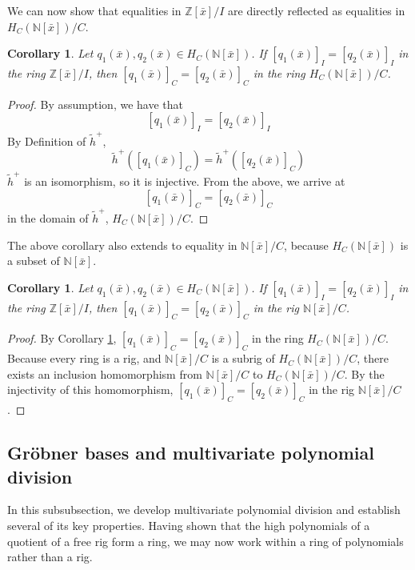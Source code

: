 \documentclass{msthesis}
\newtheorem{corollary}[theorem]{Corollary}
\theoremstyle{definition}
\newcommand{\ints}{\mathbb{Z}}
\newcommand{\nat}{\mathbb{N}}
\begin{document}
We can now show that equalities in $\ints[\bar{x}]/I$ are directly reflected as equalities in $H_C(\nat[\bar{x}])/C$.

\begin{corollary}\label{cor:equalityZtoN}
    Let $q_1(\bar{x}), q_2(\bar{x}) \in H_C(\nat[\bar{x}])$.  If $[q_1(\bar{x})]_I = [q_2(\bar{x})]_I$ in the ring $\ints[\bar{x}]/I$, then $[q_1(\bar{x})]_C = [q_2(\bar{x})]_C$ in the ring $H_C(\nat[\bar{x}])/C$.
\end{corollary}
\begin{proof}
    By assumption, we have that 
    \[ [q_1(\bar{x})]_I = [q_2(\bar{x})]_I \]
    By Definition of $\tilde{h}^+$, 
    \[ \tilde{h}^+([q_1(\bar{x})]_C) = \tilde{h}^+([q_2(\bar{x})]_C)\]
    $\tilde{h}^+$ is an isomorphism, so it is injective.  From the above, we arrive at
    \[ [q_1(\bar{x})]_C = [q_2(\bar{x})]_C \]
    in the domain of $\tilde{h}^+$, $H_C(\nat[\bar{x}])/C$.
\end{proof}

The above corollary also extends to equality in $\nat[\bar{x}]/C$, because $H_C(\nat[\bar{x}])$ is a subset of $\nat[\bar{x}]$.

\begin{corollary}\label{cor:equalityHNtoN}
    Let $q_1(\bar{x}), q_2(\bar{x}) \in H_C(\nat[\bar{x}])$.  If $[q_1(\bar{x})]_I = [q_2(\bar{x})]_I$ in the ring $\ints[\bar{x}]/I$, then $[q_1(\bar{x})]_C = [q_2(\bar{x})]_C$ in the rig $\nat[\bar{x}]/C$.
\end{corollary}
\begin{proof}
    By Corollary \ref{cor:equalityZtoN}, $[q_1(\bar{x})]_C  = [q_2(\bar{x})]_C$ in the ring $H_C(\nat[\bar{x}])/C$.  Because every ring is a rig, and $\nat[\bar{x}]/C$ is a subrig of $H_C(\nat[\bar{x}])/C$, there exists an inclusion homomorphism from $\nat[\bar{x}]/C$ to $H_C(\nat[\bar{x}])/C$.  By the injectivity of this homomorphism, $[q_1(\bar{x})]_C  = [q_2(\bar{x})]_C$ in the rig $\nat[\bar{x}]/C$.
\end{proof}

\subsection{Gr\"{o}bner bases and multivariate polynomial division}

In this subsubsection, we develop multivariate polynomial division and establish several of its key properties. Having shown that the high polynomials of a quotient of a free rig form a ring, we may now work within a ring of polynomials rather than a rig.
\end{document}
